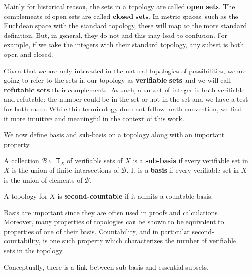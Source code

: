 \documentclass[11pt,letterpaper,fleqn]{memoir} %
\begin{document}
Mainly for historical reason, the sets in a topology are called \textbf{open sets}. The complements of open sets are called \textbf{closed sets}. In metric spaces, such as the Euclidean space with the standard topology, these will map to the more standard definition. But, in general, they do not and this may lead to confusion. For example, if we take the integers with their standard topology, any subset is both open and closed.

Given that we are only interested in the natural topologies of possibilities, we are going to refer to the sets in our topology as \textbf{verifiable sets} and we will call \textbf{refutable sets} their complements. As such, a subset of integer is both verifiable and refutable: the number could be in the set or not in the set and we have a test for both cases.  While this terminology does not follow math convention, we find it more intuitive and meaningful in the context of this work.

We now define basis and sub-basis on a topology along with an important property.
\begin{mathSection}
\begin{defn}
	A collection $\mathcal{B} \subseteq \mathsf{T}_X$ of verifiable sets of $X$ is a \textbf{sub-basis} if every verifiable set in $X$ is the union of finite intersections of $\mathcal{B}$. It is a \textbf{basis} if every verifiable set in $X$ is the union of elements of $\mathcal{B}$.
\end{defn}
\begin{defn}
	A topology for $X$ is \textbf{second-countable} if it admits a countable basis.
\end{defn}
\end{mathSection}

Basis are important since they are often used in proofs and calculations. Moreover, many properties of topologies can be shown to be equivalent to properties of one of their basis. Countability, and in particular second-countability, is one such property which characterizes the number of verifiable sets in the topology.

Conceptually, there is a link between sub-basis and essential subsets.
\end{document}
